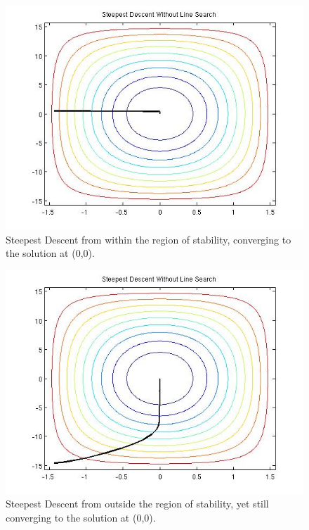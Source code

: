 \documentclass{article}
\begin{document}
\begin{figure}[!htb]
  \includegraphics[scale=.5]{figs/P1SDNLSwin.jpg}
  \caption{Steepest Descent from within the region of stability,
 converging to the solution at (0,0).}   
\end{figure}

\begin{figure}[!htb]
  \includegraphics[scale=.5]{figs/P1SDNLSFail.jpg}
  \caption{Steepest Descent from outside the region of stability, yet
 still converging to the solution at (0,0).}   
\end{figure}
\end{document}
